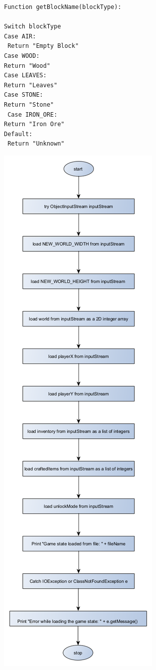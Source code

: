 \begin{lstlisting}
Function getBlockName(blockType):

Switch blockType 
Case AIR:
 Return "Empty Block" 
Case WOOD: 
Return "Wood" 
Case LEAVES: 
Return "Leaves" 
Case STONE: 
Return "Stone"
 Case IRON_ORE: 
Return "Iron Ore" 
Default:
 Return "Unknown" 

\end{lstlisting}

{\includegraphics[height=\textheight]{../flowchart/loadGame.png}}

